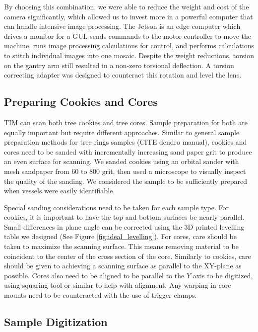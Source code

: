 \documentclass[a4paper,12pt]{article}
\begin{document}
By choosing this combination, we were able to reduce the weight and cost of the camera significantly, which allowed us to invest more in a powerful computer that can handle intensive image processing. 
The Jetson is an edge computer which drives a monitor for a GUI, sends commands to the motor controller to move the machine, runs image processing calculations for control, and performs calculations to stitch individual images into one mosaic. 
Despite the weight reductions, torsion on the gantry arm still resulted in a non-zero torsional deflection. A torsion correcting adapter was designed to counteract this rotation and level the lens.

\subsection{Preparing Cookies and Cores}
TIM can scan both tree cookies and tree cores. Sample preparation for both are equally important but require different approaches.
Similar to general sample preparation methods for tree rings samples (CITE dendro manual), cookies and cores need to be sanded with incrementally increasing sand paper grit to produce an even surface for scanning. We sanded cookies using an orbital sander with mesh sandpaper from 60 to 800 grit, then used a microscope to visually inspect the quality of the sanding. We considered the sample to be sufficiently prepared when vessels were easily identifiable.

Special sanding considerations need to be taken for each sample type. 
For cookies, it is important to have the top and bottom surfaces be nearly parallel. Small differences in plane angle can be corrected using the 3D printed levelling table we designed (See Figure \ref{fig:ideal_levelling}). 
For cores, care should be taken to maximize the scanning surface. This means removing material to be coincident to the center of the cross section of the core. 
Similarly to cookies, care should be given to achieving a scanning surface as parallel to the XY-plane as possible.
Cores also need to be aligned to be parallel to the $Y$ axis to be digitized, using squaring tool or similar to help with alignment. Any warping in core mounts need to be counteracted with the use of trigger clamps. 

\subsection{Sample Digitization} %
\end{document}
